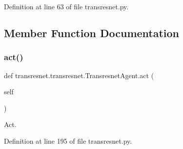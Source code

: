 Definition at line 63 of file transresnet.\+py.



\subsection{Member Function Documentation}
\mbox{\label{classtransresnet_1_1transresnet_1_1TransresnetAgent_ad59fea461b2ea1f9731742901203bdd7}} 
\subsubsection{\texorpdfstring{act()}{act()}}
{\footnotesize\ttfamily def transresnet.\+transresnet.\+Transresnet\+Agent.\+act (\begin{DoxyParamCaption}\item[{}]{self }\end{DoxyParamCaption})}

\begin{DoxyVerb}Act.\end{DoxyVerb}
 

Definition at line 195 of file transresnet.\+py.



